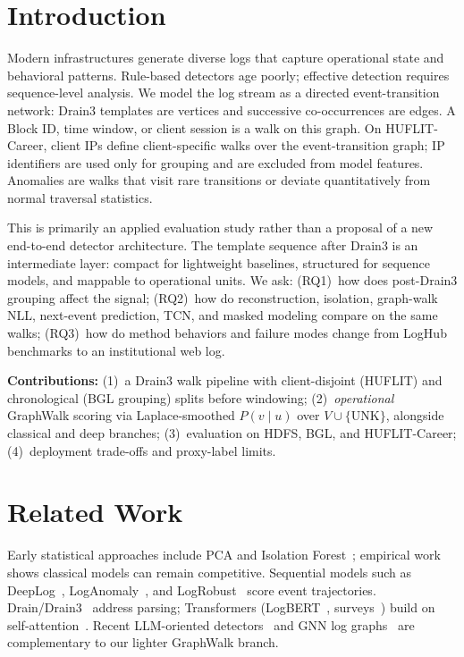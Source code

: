 \documentclass[runningheads]{llncs}
\begin{document}
\section{Introduction}
Modern infrastructures generate diverse logs that capture operational state and behavioral patterns. Rule-based detectors age poorly; effective detection requires sequence-level analysis. We model the log stream as a directed event-transition network: Drain3 templates are vertices and successive co-occurrences are edges. A Block ID, time window, or client session is a walk on this graph. On HUFLIT-Career, client IPs define client-specific walks over the event-transition graph; IP identifiers are used only for grouping and are excluded from model features. Anomalies are walks that visit rare transitions or deviate quantitatively from normal traversal statistics.

This is primarily an applied evaluation study rather than a proposal of a new end-to-end detector architecture. The template sequence after Drain3 is an intermediate layer: compact for lightweight baselines, structured for sequence models, and mappable to operational units. We ask: (RQ1)~how does post-Drain3 grouping affect the signal; (RQ2)~how do reconstruction, isolation, graph-walk NLL, next-event prediction, TCN, and masked modeling compare on the same walks; (RQ3)~how do method behaviors and failure modes change from LogHub benchmarks to an institutional web log.

\textbf{Contributions:} (1)~a Drain3 walk pipeline with client-disjoint (HUFLIT) and chronological (BGL grouping) splits before windowing; (2)~\emph{operational} GraphWalk scoring via Laplace-smoothed $P(v\mid u)$ over $V\cup\{\mathrm{UNK}\}$, alongside classical and deep branches; (3)~evaluation on HDFS, BGL, and HUFLIT-Career; (4)~deployment trade-offs and proxy-label limits.

\section{Related Work}
Early statistical approaches include PCA and Isolation Forest~\cite{b10,b11}; empirical work~\cite{b24} shows classical models can remain competitive. Sequential models such as DeepLog~\cite{b1}, LogAnomaly~\cite{b13}, and LogRobust~\cite{b14} score event trajectories. Drain/Drain3~\cite{b3} address parsing; Transformers (LogBERT~\cite{b2}, surveys~\cite{b16}) build on self-attention~\cite{b4}. Recent LLM-oriented detectors~\cite{b20,b22} and GNN log graphs~\cite{b27,b28} are complementary to our lighter GraphWalk branch.
\end{document}
